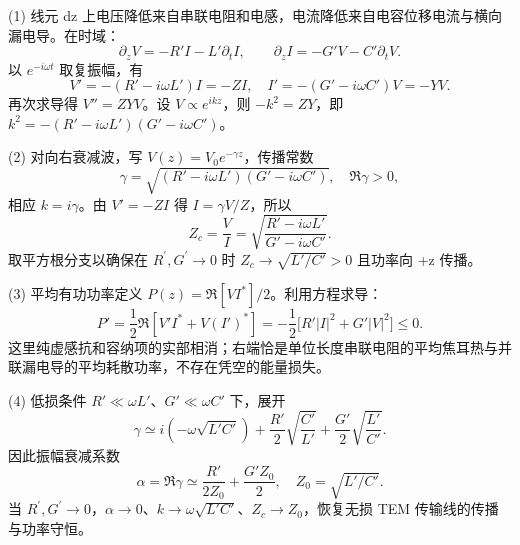(1) 线元 dz 上电压降低来自串联电阻和电感，电流降低来自电容位移电流与横向漏电导。在时域：
\[
\partial_zV=-R'I-L'\partial_tI,\qquad
\partial_zI=-G'V-C'\partial_tV.
\]
以 \(e^{-i\omega t}\) 取复振幅，有
\[
V'=-(R'-i\omega L')I=-ZI,\quad
I'=-(G'-i\omega C')V=-YV.
\]
再次求导得 \(V''=ZYV\)。设 \(V\propto e^{ikz}\)，则 \(-k^2=ZY\)，即 \(k^2=-(R'-i\omega L')(G'-i\omega C')\)。

(2) 对向右衰减波，写 \(V(z)=V_0e^{-\gamma z}\)，传播常数
\[
\gamma=\sqrt{(R'-i\omega L')(G'-i\omega C')},\quad\Re\gamma>0,
\]
相应 \(k=i\gamma\)。由 \(V'=-ZI\) 得 \(I=\gamma V/Z\)，所以
\[
Z_c=\frac VI=\sqrt{\frac{R'-i\omega L'}{G'-i\omega C'}}.
\]
取平方根分支以确保在 \(R^{\prime},G^{\prime}\to 0\) 时 \(Z_c\to\sqrt{L'/C'}>0\) 且功率向 +z 传播。

(3) 平均有功功率定义 \(P(z)=\Re[VI^*]/2\)。利用方程求导：
\[
P'=\frac12\Re[V'I^*+V(I')^*]
=-\frac12\big[R'|I|^2+G'|V|^2\big]\le0.
\]
这里纯虚感抗和容纳项的实部相消；右端恰是单位长度串联电阻的平均焦耳热与并联漏电导的平均耗散功率，不存在凭空的能量损失。

(4) 低损条件 \(R'\ll\omega L'\)、\(G'\ll\omega C'\) 下，展开
\[
\gamma\simeq i(-\omega\sqrt{L'C'})
+\frac{R'}2\sqrt{\frac{C'}{L'}}
+\frac{G'}2\sqrt{\frac{L'}{C'}} .
\]
因此振幅衰减系数
\[
\alpha=\Re\gamma\simeq\frac{R'}{2Z_0}+\frac{G'Z_0}{2},\quad Z_0=\sqrt{L'/C'}.
\]
当 \(R^{\prime},G^{\prime}\to 0\)，\(\alpha\to0\)、\(k\to\omega\sqrt{L'C'}\)、\(Z_c\to Z_0\)，恢复无损 TEM 传输线的传播与功率守恒。
